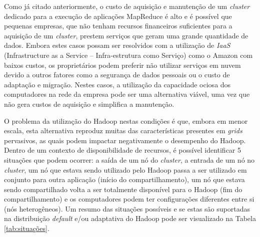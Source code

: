 Como já citado anteriormente, o custo de aquisição e manutenção de um \textit{cluster} dedicado para a execução de aplicações MapReduce é alto e é possível que pequenas empresas, que não tenham recursos financeiros suficientes para a aquisição de um \textit{cluster}, prestem serviços que geram uma grande quantidade de dados. Embora estes casos possam ser resolvidos com a utilização de \textit{IaaS} (Infrastructure as a Service -- Infra-estrutura como Serviço) como o Amazon \citet{amazonEC2} com  baixos custos, os proprietários podem preferir não utilizar serviços em nuvem devido a outros fatores como a segurança de dados pessoais ou o custo de adaptação e migração. Nestes casos, a utilização da capacidade ociosa dos computadores na rede da empresa pode ser uma alternativa viável, uma vez que não gera custos de aquisição e simplifica a manutenção.

O problema da utilização do Hadoop nestas condições é que, embora em menor escala, esta alternativa reproduz muitas das características presentes em \textit{grids} pervasivos, as quais podem impactar negativamente o desempenho do Hadoop. Dentro de um contexto de disponibilidade de recursos, é possível identificar 5 situações que podem ocorrer: a saída de um nó do \textit{cluster}, a entrada de um nó no \textit{cluster}, um nó que estava sendo utilizado pelo Hadoop passa a ser utilizado em conjunto para outra aplicação (início do compartilhamento), um nó que estava sendo compartilhado volta a ser totalmente disponível para o Hadoop (fim do compartilhamento) e os computadores podem ter configurações diferentes entre si (nós heterogêneos). Um resumo das situações possíveis e se estas são suportadas na distribuição \textit{default} e/ou adaptativa do Hadoop pode ser visualizado na Tabela \ref{tab:situações}.

